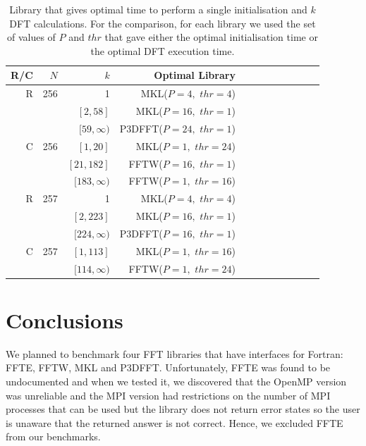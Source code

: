 \documentclass[a4paper]{article}
\begin{document}
 \begin{table}[!htbp]
\begin{center}
\begin{tabular}{|r|r|r|r|r|r||r|r|r|r|r|r|}\hline
R/C & $N$ & $k$ & Optimal Library \\ \hline
R & 256 & 1 & MKL($P=4,$ $thr=4$) \\
  &     & $[2,58]$ & MKL($P=16,$ $thr=1$) \\
  &     & $[59,\infty)$ & P3DFFT($P=24,$ $thr=1$) \\\hline
C & 256 & $[1,20]$ & MKL($P=1,$ $thr=24$) \\
  &     & $[21,182]$ & FFTW($P=16,$ $thr=1$) \\
  &     & $[183,\infty)$ & FFTW($P=1,$ $thr=16$) \\\hline
R & 257 & 1 & MKL($P=4,$ $thr=4$) \\
  &     & $[2,223]$ & MKL($P=16,$ $thr=1$) \\
  &     & $[224,\infty)$ & P3DFFT($P=16,$ $thr=1$) \\\hline
C & 257 & $[1,113]$ & MKL($P=1,$ $thr=16$) \\
  &     & $[114,\infty)$ & FFTW($P=1,$ $thr=24$) \\\hline
\end{tabular}
\caption{ Library that gives optimal time to perform a single initialisation and $k$ DFT calculations. For the comparison, for each library we used the set of values of $P$ and $thr$ that gave either the optimal initialisation time or the optimal DFT execution time.  }\label{Tbl:3DCompk}
\end{center}
\end{table}

 

\section{Conclusions}\label{Sec:Conclusions}

We planned to benchmark four FFT libraries that have interfaces for
Fortran: FFTE, FFTW, MKL and P3DFFT. Unfortunately, FFTE was found to
be undocumented and when we tested it, we discovered that the OpenMP
version was unreliable and the MPI version had restrictions on the
number of MPI processes that can be used but the library does not
return error states so the user is unaware that the returned answer is
not correct. Hence, we excluded FFTE from our benchmarks.
\end{document}

